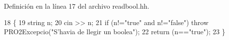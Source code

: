 Definición en la línea 17 del archivo readbool.\+hh.


\begin{DoxyCode}
18 \{
19   \textcolor{keywordtype}{string} n;
20   cin >> n;
21   \textcolor{keywordflow}{if} (n!=\textcolor{stringliteral}{"true"} and n!=\textcolor{stringliteral}{"false"}) \textcolor{keywordflow}{throw} PRO2Excepcio(\textcolor{stringliteral}{"S'havia de llegir un boolea"});
22   \textcolor{keywordflow}{return} (n==\textcolor{stringliteral}{"true"});
23 \}
\end{DoxyCode}
